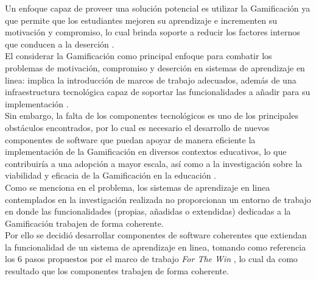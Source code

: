 Un enfoque capaz de proveer una solución potencial es utilizar la Gamificación ya que permite que los estudiantes mejoren su aprendizaje e incrementen su motivación y compromiso, lo cual brinda soporte a reducir los factores internos que conducen a la deserción \cite{dropoutOnline}.\\
    
\noindent El considerar la Gamificación como principal enfoque para combatir los problemas de motivación, compromiso y deserción en sistemas de aprendizaje en linea: implica la introducción de marcos de trabajo adecuados, además de una infraestructura tecnológica capaz de soportar las funcionalidades a añadir para su implementación \cite{mappingStudy}.\\
    
\noindent Sin embargo, la falta de los componentes tecnológicos es uno de los principales obstáculos encontrados, por lo cual es necesario el desarrollo de nuevos componentes de software que puedan apoyar de manera eficiente la implementación de la Gamificación en diversos contextos educativos, lo que contribuiría a una adopción a mayor escala, así como a la investigación sobre la viabilidad y eficacia de la Gamificación en la educación \cite{mappingStudy}.\\
    
    

\noindent Como se menciona en el problema, los sistemas de aprendizaje en linea contemplados en la investigación realizada no proporcionan un entorno de trabajo en donde las funcionalidades (propias, añadidas o extendidas) dedicadas a la Gamificación trabajen de forma coherente.\\
    
\noindent Por ello se decidió desarrollar componentes de software coherentes que extiendan la funcionalidad de un sistema de aprendizaje en linea, tomando como referencia los 6 pasos propuestos por el marco de trabajo {\it For The Win} \cite{FrameWorkForTheWin}, lo cual da como resultado que los componentes trabajen de forma coherente.
    
